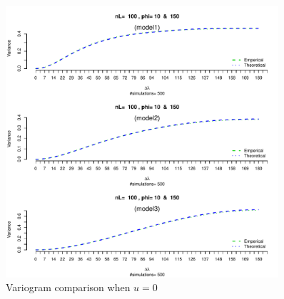 \begin{figure}[H]
\centering
\includegraphics [width=0.9\textwidth ]{graphs/results_variogram_comparison}
\caption[Variogram comparison]{Variogram comparison when $u=0$ }
\end{figure}


